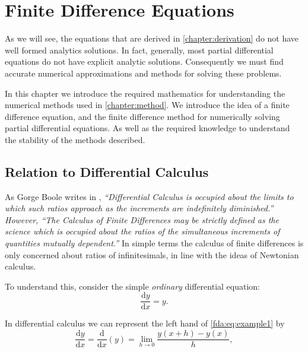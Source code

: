 \documentclass[../main.tex]{subfiles}
\begin{document}
  \chapter{Finite Difference Equations}\label{chapter:fdes}

  As we will see, the equations that are derived in \autoref{chapter:derivation} do not have well formed analytics solutions. In fact, generally, most partial differential equations do not have explicit analytic solutions. Consequently we must find accurate numerical approximations and methods for solving these problems.

  In this chapter we introduce the required mathematics for understanding the numerical methods used in \autoref{chapter:method}. We introduce the idea of a finite difference equation, and the finite difference method for numerically solving partial differential equations. As well as the required knowledge to understand the stability of the methods described.

  \section{Relation to Differential Calculus}\label{sec:fdes:intro}
  As Gorge Boole writes in \cite{boole1880}, \emph{``Differential Calculus is occupied about the limits to which such ratios approach as the increments are indefinitely diminished.'' However, ``The Calculus of Finite Differences may be strictly defined as the science which is occupied about the ratios of the simultaneous increments of quantities mutually dependent.''} In simple terms the calculus of finite differences is only concerned about ratios of infinitesimals, in line with the ideas of Newtonian calculus. \par

  To understand this, consider the simple \emph{ordinary} differential equation: \\

  \begin{equation}\label{fda:eq:example1}
    \frac{\mathrm{d}y}{\mathrm{d}x} = y.
  \end{equation}

  In differential calculus we can represent the left hand of \autoref{fda:eq:example1} by \\

  \begin{equation}
    \frac{\mathrm{d}y}{\mathrm{d}x} = \frac{\mathrm{d}}{\mathrm{d}x}(y) = \lim_{h \to 0} \frac{y(x+h) - y(x)}{h},
  \end{equation}
\end{document}
